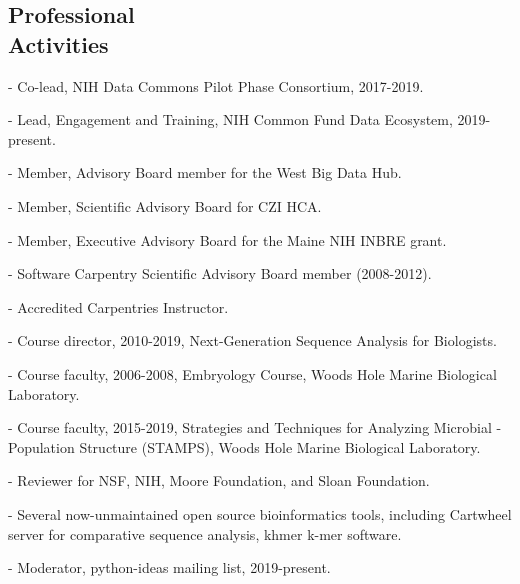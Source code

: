 \documentclass[margin,line]{resume}
\begin{document}
\begin{resume}
    \section{\mysidestyle Professional\\Activities}

    \begin{list1}
\item[] - Co-lead, NIH Data Commons Pilot Phase Consortium, 2017-2019.
\item[] - Lead, Engagement and Training, NIH Common Fund Data Ecosystem, 2019-present.
\item[] - Member, Advisory Board member for the West Big Data Hub.
\item[] - Member, Scientific Advisory Board for CZI HCA.
\item[] - Member, Executive Advisory Board for the Maine NIH INBRE grant.
\item[] - Software Carpentry Scientific Advisory Board member (2008-2012).
\item[] - Accredited Carpentries Instructor.
\item[] - Course director, 2010-2019, Next-Generation Sequence Analysis for Biologists.
\item[] - Course faculty, 2006-2008, Embryology Course, Woods Hole Marine Biological Laboratory.
\item[] - Course faculty, 2015-2019, Strategies and Techniques for Analyzing Microbial - Population Structure (STAMPS), Woods Hole Marine Biological Laboratory.
\item[] - Reviewer for NSF, NIH, Moore Foundation, and Sloan Foundation.
\item[] - Several now-unmaintained open source bioinformatics tools, including
  Cartwheel server for comparative sequence analysis, khmer k-mer software.
\item[] - Moderator, python-ideas mailing list, 2019-present.
\end{list1}

\vspace{2cm}
    

\end{resume}
\end{document}
